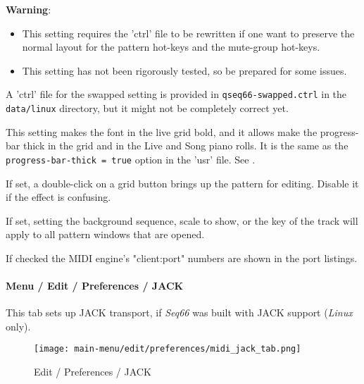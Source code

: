    \textbf{Warning}:

      \begin{itemize}
         \item This setting requires the 'ctrl' file to be rewritten
            if one want to preserve the normal layout for the pattern hot-keys
            and the mute-group hot-keys.
         \item This setting has not been rigorously tested, so be prepared for
            some issues.
      \end{itemize}

   A 'ctrl' file for the swapped setting is provided
   in \texttt{qseq66-swapped.ctrl} in the \texttt{data/linux}
   directory, but it might not be completely correct yet.

   This setting makes the font in the live grid bold, and it allows
   make the progress-bar thick in the grid and in the Live and Song piano
   rolls.
   It is the same as the \texttt{progress-bar-thick = true} option in the 'usr'
   file. See .

   If set, a double-click on a grid button brings up the pattern for editing.
   Disable it if the effect is confusing.

   If set, setting the background sequence, scale to show, or the key of the
   track will apply to all pattern windows that are opened.

   If checked the MIDI engine's "client:port" numbers are shown in the port
   listings.
 
\paragraph{Menu / Edit / Preferences / JACK}
\label{paragraph:menu_edit_preferences_jack}

   This tab sets up JACK transport, if \textsl{Seq66}
   was built with JACK support (\textsl{Linux} only).

\begin{figure}[H]
   \centering 
   \texttt{[image: main-menu/edit/preferences/midi\_jack\_tab.png]}
   \caption{Edit / Preferences / JACK}
   \label{fig:midi_jack_tab}
\end{figure}

